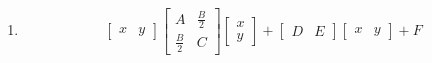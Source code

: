\renewcommand{\theequation}{\theenumi}
\begin{enumerate}[label=\arabic*.,ref=\thesubsection.\theenumi]

\item \begin{align}
\begin{bmatrix}x & y\end{bmatrix}\begin{bmatrix}A & \frac{B}{2}\\\frac{B}{2} & C\end{bmatrix}\begin{bmatrix}x \\ y\end{bmatrix} + \begin{bmatrix}D & E\end{bmatrix}\begin{bmatrix}x & y\end{bmatrix} +F
\end{align}


\end{enumerate}
